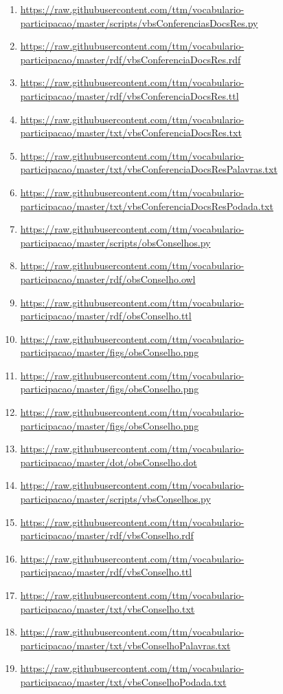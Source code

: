 \documentclass[12pt]{article}
\begin{document}
{\begin{enumerate}
\item \url{https://raw.githubusercontent.com/ttm/vocabulario-participacao/master/scripts/vbsConferenciasDocsRes.py}         \label{i:12a}
     \item \url{https://raw.githubusercontent.com/ttm/vocabulario-participacao/master/rdf/vbsConferenciaDocsRes.rdf}        \label{i:13a}
     \item \url{https://raw.githubusercontent.com/ttm/vocabulario-participacao/master/rdf/vbsConferenciaDocsRes.ttl}        \label{i:14a}
     \item \url{https://raw.githubusercontent.com/ttm/vocabulario-participacao/master/txt/vbsConferenciaDocsRes.txt}        \label{i:16a}
     \item \url{https://raw.githubusercontent.com/ttm/vocabulario-participacao/master/txt/vbsConferenciaDocsResPalavras.txt}\label{i:17a}
     \item \url{https://raw.githubusercontent.com/ttm/vocabulario-participacao/master/txt/vbsConferenciaDocsResPodada.txt}  \label{i:18a}



    \item \url{https://raw.githubusercontent.com/ttm/vocabulario-participacao/master/scripts/obsConselhos.py}\label{i:19}
    \item  \url{https://raw.githubusercontent.com/ttm/vocabulario-participacao/master/rdf/obsConselho.owl}\label{i:20}
    \item  \url{https://raw.githubusercontent.com/ttm/vocabulario-participacao/master/rdf/obsConselho.ttl}\label{i:21}
    \item \url{https://raw.githubusercontent.com/ttm/vocabulario-participacao/master/figs/obsConselho.png}\label{i:22}
    \item \url{https://raw.githubusercontent.com/ttm/vocabulario-participacao/master/figs/obsConselho.png}\label{i:23}
    \item \url{https://raw.githubusercontent.com/ttm/vocabulario-participacao/master/figs/obsConselho.png}\label{i:24}
    \item \url{https://raw.githubusercontent.com/ttm/vocabulario-participacao/master/dot/obsConselho.dot}\label{i:24_1}

    \item \url{https://raw.githubusercontent.com/ttm/vocabulario-participacao/master/scripts/vbsConselhos.py}\label{i:25}
    \item \url{https://raw.githubusercontent.com/ttm/vocabulario-participacao/master/rdf/vbsConselho.rdf}\label{i:26}
    \item \url{https://raw.githubusercontent.com/ttm/vocabulario-participacao/master/rdf/vbsConselho.ttl}\label{i:27}
    \item \url{https://raw.githubusercontent.com/ttm/vocabulario-participacao/master/txt/vbsConselho.txt}\label{i:28}
    \item \url{https://raw.githubusercontent.com/ttm/vocabulario-participacao/master/txt/vbsConselhoPalavras.txt}\label{i:29}
    \item \url{https://raw.githubusercontent.com/ttm/vocabulario-participacao/master/txt/vbsConselhoPodada.txt}\label{i:30}


\end{enumerate}}
\end{document}
